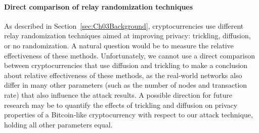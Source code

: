 \paragraph{Direct comparison of relay randomization techniques}
As described in Section~\ref{sec:Ch03Background}, cryptocurrencies use different relay randomization techniques aimed at improving privacy: trickling, diffusion, or no randomization.
A natural question would be to measure the relative effectiveness of these methods.
Unfortunately, we cannot use a direct comparison between cryptocurrencies that use diffusion and trickling to make a conclusion about relative effectiveness of these methods, as the real-world networks also differ in many other parameters (such as the number of nodes and transaction rate) that also influence the attack results.
A possible direction for future research may be to quantify the effects of trickling and diffusion on privacy properties of a Bitcoin-like cryptocurrency with respect to our attack technique, holding all other parameters equal.